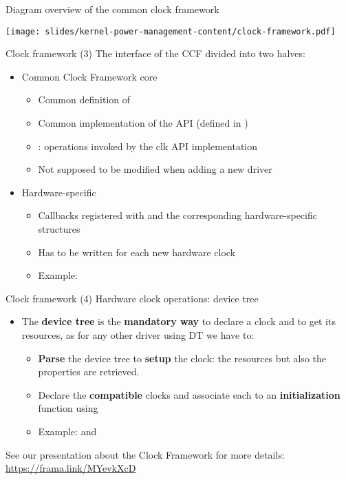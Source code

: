 \begin{frame}{Diagram overview of the common clock framework}
  \begin{center}
    \texttt{[image: slides/kernel-power-management-content/clock-framework.pdf]}
\end{center}
\end{frame}

\begin{frame}{Clock framework (3)}
  The interface of the CCF divided into two halves:
  \begin{itemize}
  \item Common Clock Framework core
    \begin{itemize}
    \item Common definition of 
    \item Common implementation of the  API (defined in
      )
    \item {}: operations invoked by the clk API
      implementation
    \item Not supposed to be modified when adding a new driver
    \end{itemize}
  \item Hardware-specific
    \begin{itemize}
    \item Callbacks registered with  and the
      corresponding hardware-specific structures
    \item Has to be written for each new hardware clock
    \item Example: 
    \end{itemize}
  \end{itemize}
\end{frame}

\begin{frame}{Clock framework (4)}
  Hardware clock operations: device tree
  \begin{itemize}
  \item The \textbf{device tree} is the \textbf{mandatory way} to
    declare a clock and to get its resources, as for any other
    driver using DT we have to:
    \begin{itemize}
    \item \textbf{Parse} the device tree to \textbf{setup} the
      clock: the resources but also the properties are retrieved.
    \item Declare the \textbf{compatible} clocks and associate each
      to an \textbf{initialization} function using
    \item Example:  and
    \end{itemize}
  \end{itemize}
  See our presentation about the Clock Framework for more details: \url{https://frama.link/MYevkXcD}
\end{frame}

